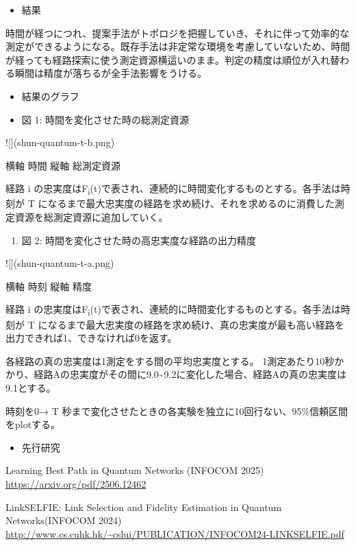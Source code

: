 \documentclass[conference]{IEEEtran}
\begin{document}
\begin{itemize}
\item 結果
\end{itemize}

時間が経つにつれ、提案手法がトポロジを把握していき、それに伴って効率的な測定ができるようになる。既存手法は非定常な環境を考慮していないため、時間が経っても経路探索に使う測定資源横這いのまま。判定の精度は順位が入れ替わる瞬間は精度が落ちるが全手法影響をうける。

\begin{itemize}
\item 結果のグラフ

\item 図 1: 時間を変化させた時の総測定資源
\end{itemize}

![](shun-quantum-t-b.png)

横軸 時間
縦軸 総測定資源

経路 i の忠実度はF\textsubscript{i}(t)で表され、連続的に時間変化するものとする。各手法は時刻が T になるまで最大忠実度の経路を求め続け、それを求めるのに消費した測定資源を総測定資源に追加していく。



\begin{enumerate}
\item 図 2: 時間を変化させた時の高忠実度な経路の出力精度
\end{enumerate}

![](shun-quantum-t-a.png)

横軸 時刻
縦軸 精度

経路 i の忠実度はF\textsubscript{i}(t)で表され、連続的に時間変化するものとする。各手法は時刻が T になるまで最大忠実度の経路を求め続け、真の忠実度が最も高い経路を出力できれば1、できなければ0を返す。


各経路の真の忠実度は1測定をする間の平均忠実度とする。
1測定あたり10秒かかり、経路Aの忠実度がその間に9.0\textasciitilde{}9.2に変化した場合、経路Aの真の忠実度は9.1とする。

時刻を0→ T 秒まで変化させたときの各実験を独立に10回行ない、95\%信頼区間をplotする。

\begin{itemize}
\item 先行研究
\end{itemize}
Learning Best Path in Quantum Networks (INFOCOM 2025)
\url{https://arxiv.org/pdf/2506.12462}

LinkSELFIE: Link Selection and Fidelity Estimation in Quantum Networks(INFOCOM 2024)
\url{http://www.cs.cuhk.hk/\~cslui/PUBLICATION/INFOCOM24-LINKSELFIE.pdf}
\end{document}
